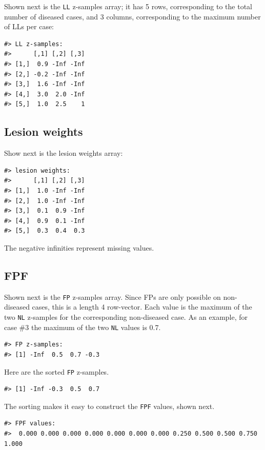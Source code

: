 \documentclass[
]{book}
\begin{document}
Shown next is the \texttt{LL} z-samples array; it has 5 rows, corresponding to the total number of diseased cases, and 3 columns, corresponding to the maximum number of LLs per case:

\begin{verbatim}
#> LL z-samples:
#>      [,1] [,2] [,3]
#> [1,]  0.9 -Inf -Inf
#> [2,] -0.2 -Inf -Inf
#> [3,]  1.6 -Inf -Inf
#> [4,]  3.0  2.0 -Inf
#> [5,]  1.0  2.5    1
\end{verbatim}

\hypertarget{lesion-weights}{%
\subsection{Lesion weights}\label{lesion-weights}}

Show next is the lesion weights array:

\begin{verbatim}
#> lesion weights:
#>      [,1] [,2] [,3]
#> [1,]  1.0 -Inf -Inf
#> [2,]  1.0 -Inf -Inf
#> [3,]  0.1  0.9 -Inf
#> [4,]  0.9  0.1 -Inf
#> [5,]  0.3  0.4  0.3
\end{verbatim}

The negative infinities represent missing values.

\hypertarget{fpf}{%
\subsection{FPF}\label{fpf}}

Shown next is the \texttt{FP} z-samples array. Since FPs are only possible on non-diseased cases, this is a length 4 row-vector. Each value is the maximum of the two \texttt{NL} z-samples for the corresponding non-diseased case. As an example, for case \#3 the maximum of the two \texttt{NL} values is 0.7.

\begin{verbatim}
#> FP z-samples:
#> [1] -Inf  0.5  0.7 -0.3
\end{verbatim}

Here are the sorted \texttt{FP} z-samples.

\begin{verbatim}
#> [1] -Inf -0.3  0.5  0.7
\end{verbatim}

The sorting makes it easy to construct the \texttt{FPF} values, shown next.

\begin{verbatim}
#> FPF values:
#>  0.000 0.000 0.000 0.000 0.000 0.000 0.000 0.250 0.500 0.500 0.750 1.000
\end{verbatim}
\end{document}
